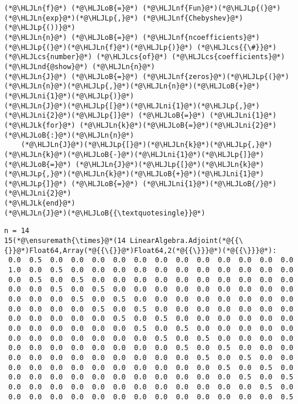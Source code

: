 \documentclass[12pt,a4paper]{article}
\newcommand{\HLJLk}[1]{\textcolor[RGB]{148,91,176}{\textbf{#1}}}
\newcommand{\HLJLn}[1]{#1}
\newcommand{\HLJLnd}[1]{\textcolor[RGB]{214,102,97}{#1}}
\newcommand{\HLJLnf}[1]{\textcolor[RGB]{66,102,213}{#1}}
\newcommand{\HLJLni}[1]{\textcolor[RGB]{59,151,46}{#1}}
\newcommand{\HLJLoB}[1]{\textcolor[RGB]{102,102,102}{\textbf{#1}}}
\newcommand{\HLJLp}[1]{#1}
\newcommand{\HLJLcs}[1]{\textcolor[RGB]{153,153,119}{\textit{#1}}}
\begin{document}
\begin{lstlisting}
(*@\HLJLn{f}@*) (*@\HLJLoB{=}@*) (*@\HLJLnf{Fun}@*)(*@\HLJLp{(}@*)(*@\HLJLn{exp}@*)(*@\HLJLp{,}@*) (*@\HLJLnf{Chebyshev}@*)(*@\HLJLp{())}@*)
(*@\HLJLn{n}@*) (*@\HLJLoB{=}@*) (*@\HLJLnf{ncoefficients}@*)(*@\HLJLp{(}@*)(*@\HLJLn{f}@*)(*@\HLJLp{)}@*) (*@\HLJLcs{{\#}}@*) (*@\HLJLcs{number}@*) (*@\HLJLcs{of}@*) (*@\HLJLcs{coefficients}@*)
(*@\HLJLnd{@show}@*) (*@\HLJLn{n}@*)
(*@\HLJLn{J}@*) (*@\HLJLoB{=}@*) (*@\HLJLnf{zeros}@*)(*@\HLJLp{(}@*)(*@\HLJLn{n}@*)(*@\HLJLp{,}@*)(*@\HLJLn{n}@*)(*@\HLJLoB{+}@*)(*@\HLJLni{1}@*)(*@\HLJLp{)}@*)
(*@\HLJLn{J}@*)(*@\HLJLp{[}@*)(*@\HLJLni{1}@*)(*@\HLJLp{,}@*)(*@\HLJLni{2}@*)(*@\HLJLp{]}@*) (*@\HLJLoB{=}@*) (*@\HLJLni{1}@*)
(*@\HLJLk{for}@*) (*@\HLJLn{k}@*)(*@\HLJLoB{=}@*)(*@\HLJLni{2}@*)(*@\HLJLoB{:}@*)(*@\HLJLn{n}@*)
    (*@\HLJLn{J}@*)(*@\HLJLp{[}@*)(*@\HLJLn{k}@*)(*@\HLJLp{,}@*)(*@\HLJLn{k}@*)(*@\HLJLoB{-}@*)(*@\HLJLni{1}@*)(*@\HLJLp{]}@*) (*@\HLJLoB{=}@*) (*@\HLJLn{J}@*)(*@\HLJLp{[}@*)(*@\HLJLn{k}@*)(*@\HLJLp{,}@*)(*@\HLJLn{k}@*)(*@\HLJLoB{+}@*)(*@\HLJLni{1}@*)(*@\HLJLp{]}@*) (*@\HLJLoB{=}@*) (*@\HLJLni{1}@*)(*@\HLJLoB{/}@*)(*@\HLJLni{2}@*)
(*@\HLJLk{end}@*)
(*@\HLJLn{J}@*)(*@\HLJLoB{{\textquotesingle}}@*)
\end{lstlisting}

\begin{lstlisting}
n = 14
15(*@\ensuremath{\times}@*(14 LinearAlgebra.Adjoint(*@{{\{}}@*)Float64,Array(*@{{\{}}@*)Float64,2(*@{{\}}}@*)(*@{{\}}}@*):
 0.0  0.5  0.0  0.0  0.0  0.0  0.0  0.0  0.0  0.0  0.0  0.0  0.0  0.0
 1.0  0.0  0.5  0.0  0.0  0.0  0.0  0.0  0.0  0.0  0.0  0.0  0.0  0.0
 0.0  0.5  0.0  0.5  0.0  0.0  0.0  0.0  0.0  0.0  0.0  0.0  0.0  0.0
 0.0  0.0  0.5  0.0  0.5  0.0  0.0  0.0  0.0  0.0  0.0  0.0  0.0  0.0
 0.0  0.0  0.0  0.5  0.0  0.5  0.0  0.0  0.0  0.0  0.0  0.0  0.0  0.0
 0.0  0.0  0.0  0.0  0.5  0.0  0.5  0.0  0.0  0.0  0.0  0.0  0.0  0.0
 0.0  0.0  0.0  0.0  0.0  0.5  0.0  0.5  0.0  0.0  0.0  0.0  0.0  0.0
 0.0  0.0  0.0  0.0  0.0  0.0  0.5  0.0  0.5  0.0  0.0  0.0  0.0  0.0
 0.0  0.0  0.0  0.0  0.0  0.0  0.0  0.5  0.0  0.5  0.0  0.0  0.0  0.0
 0.0  0.0  0.0  0.0  0.0  0.0  0.0  0.0  0.5  0.0  0.5  0.0  0.0  0.0
 0.0  0.0  0.0  0.0  0.0  0.0  0.0  0.0  0.0  0.5  0.0  0.5  0.0  0.0
 0.0  0.0  0.0  0.0  0.0  0.0  0.0  0.0  0.0  0.0  0.5  0.0  0.5  0.0
 0.0  0.0  0.0  0.0  0.0  0.0  0.0  0.0  0.0  0.0  0.0  0.5  0.0  0.5
 0.0  0.0  0.0  0.0  0.0  0.0  0.0  0.0  0.0  0.0  0.0  0.0  0.5  0.0
 0.0  0.0  0.0  0.0  0.0  0.0  0.0  0.0  0.0  0.0  0.0  0.0  0.0  0.5
\end{lstlisting}
\end{document}
